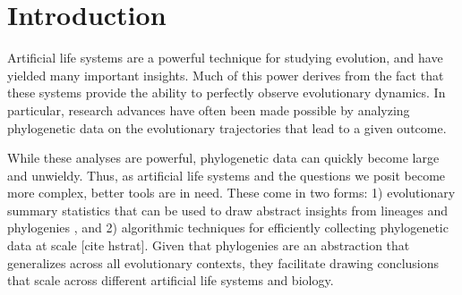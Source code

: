 \section{Introduction} \label{sec:introduction}

Artificial life systems are a powerful technique for studying evolution, and have yielded many important insights. %
Much of this power derives from the fact that these systems provide the ability to perfectly observe evolutionary dynamics. In particular, research advances have often been made possible by analyzing phylogenetic data on the evolutionary trajectories that lead to a given outcome. %

While these analyses are powerful, phylogenetic data can quickly become large and unwieldy. Thus, as artificial life systems and the questions we posit become more complex, better tools are in need. These come in two forms: 1) evolutionary summary statistics that can be used to draw abstract insights from lineages and phylogenies \citep{dolsonInterpretingTapeLife2020}, and 2) algorithmic techniques for efficiently collecting phylogenetic data at scale [cite hstrat]. Given that phylogenies are an abstraction that generalizes across all evolutionary contexts, they facilitate drawing conclusions that scale across different artificial life systems and biology. 



